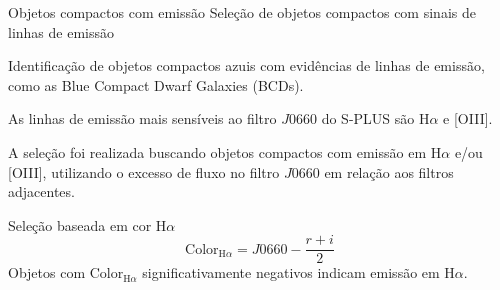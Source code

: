 \begin{frame}[c]{Objetos compactos com emissão}
Seleção de objetos compactos com sinais de linhas de emissão

Identificação de objetos compactos azuis com evidências de linhas de emissão, como as Blue Compact Dwarf Galaxies (BCDs).

As linhas de emissão mais sensíveis ao filtro $J0660$ do S-PLUS são H$\alpha$ e [OIII].

A seleção foi realizada buscando objetos compactos com emissão em H$\alpha$ e/ou [OIII], utilizando o excesso de fluxo no filtro $J0660$ em relação aos filtros adjacentes.

\begin{splusbox}{Seleção baseada em cor H$\alpha$}
    \begin{equation}
        \text{Color}_{\mathrm{H}\alpha} = J0660 - \frac{r + i}{2}
        \label{equation_halpha_color}
    \end{equation}
    Objetos com $\text{Color}_{\mathrm{H}\alpha}$ significativamente negativos indicam emissão em H$\alpha$.
\end{splusbox}

\end{frame}

